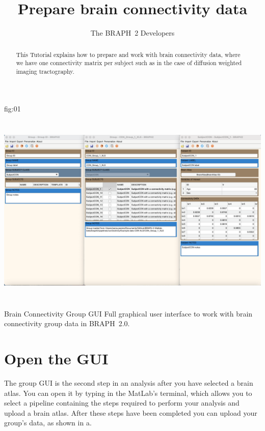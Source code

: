 \documentclass[justified]{tufte-handout}
\title{Prepare brain connectivity data}
\author[The BRAPH~2 Developers]{The BRAPH~2 Developers}
\begin{document}
\maketitle

\begin{abstract}
\noindent
This Tutorial explains how to prepare and work with brain connectivity data, where we have one connectivity matrix per subject such as in the case of diffusion weighted imaging tractography. 
\end{abstract}

\tableofcontents

	{fig:01}
	{\includegraphics[height=10cm]{fig01.png}}
	{Brain Connectivity Group GUI}
	{
	Full graphical user interface to work with brain connectivity group data in BRAPH~2.0. 
	}

\clearpage
\section{Open the GUI}

The group GUI is the second step in an analysis after you have selected a brain atlas. You can open it by typing  in the MatLab's terminal, which allows you to select a pipeline containing the steps required to perform your analysis and upload a brain atlas. After these steps have been completed you can upload your group's data, as shown in a.
\end{document}
